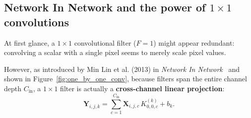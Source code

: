 \subsection{Network In Network and the power of $1 \times 1$ convolutions}
\label{sec:one_by_one_convolutions}

At first glance, a $1 \times 1$ convolutional filter ($F = 1$) might appear redundant: convolving a scalar with a single pixel seems to merely scale pixel values. 

However, as introduced by Min Lin et al. (2013) in \textit{Network In Network}~\cite{lin2013network} and shown in Figure~\ref{fig:one_by_one_conv}, because filters span the entire channel depth $C_{\text{in}}$, a $1 \times 1$ filter is actually a \textbf{cross-channel linear projection}:
\begin{equation}
\mathbf{Y}_{i, j, k} = \sum_{c=1}^{C_{\text{in}}} \mathbf{X}_{i, j, c} \, K_{0, 0, c}^{(k)} + b_k.
\label{eq:one_by_one_math}
\end{equation}

